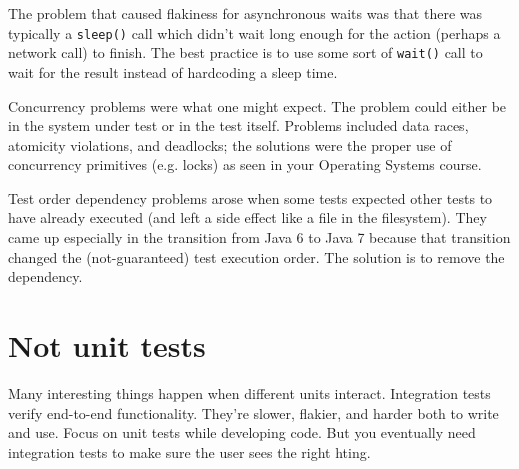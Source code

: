 \documentclass[11pt]{article}
\begin{document}
The problem that caused flakiness for asynchronous waits was that there was typically a
{\tt sleep()} call which didn't wait long enough for the action (perhaps a network call)
to finish. The best practice is to use some sort of {\tt wait()} call to wait for the result
instead of hardcoding a sleep time.

Concurrency problems were what one might expect. The problem could either be in the system under
test or in the test itself. Problems included data races, atomicity violations, and deadlocks;
the solutions were the proper use of concurrency primitives (e.g. locks) as seen in your 
Operating Systems course.

Test order dependency problems arose when some tests expected other tests to have already
executed (and left a side effect like a file in the filesystem). They came up especially 
in the transition from Java 6 to Java 7 because that transition changed the (not-guaranteed)
test execution order. The solution is to remove the dependency.

\section*{Not unit tests}
Many interesting things happen when different units interact.
Integration tests verify end-to-end functionality. They're slower, flakier, and harder both
to write and use. Focus on unit tests while developing code. But you eventually need
integration tests to make sure the user sees the right hting.




\end{document}

